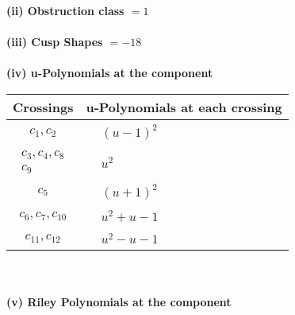 \documentclass[1p]{elsarticle_modified}
\theoremstyle{definition}
\begin{document}
\flushleft \textbf{(ii) Obstruction class $= 1$}\\~\\
\flushleft \textbf{(iii) Cusp Shapes $= -18$}\\~\\
\newpage\renewcommand{\arraystretch}{1}
\flushleft \textbf{(iv) u-Polynomials at the component}\newline \\
\begin{tabular}{m{50pt}|m{274pt}}
Crossings & \hspace{64pt}u-Polynomials at each crossing \\
\hline $$\begin{aligned}c_{1},c_{2}\end{aligned}$$&$\begin{aligned}
&(u-1)^2
\end{aligned}$\\
\hline $$\begin{aligned}c_{3},c_{4},c_{8}\\c_{9}\end{aligned}$$&$\begin{aligned}
&u^2
\end{aligned}$\\
\hline $$\begin{aligned}c_{5}\end{aligned}$$&$\begin{aligned}
&(u+1)^2
\end{aligned}$\\
\hline $$\begin{aligned}c_{6},c_{7},c_{10}\end{aligned}$$&$\begin{aligned}
&u^2+u-1
\end{aligned}$\\
\hline $$\begin{aligned}c_{11},c_{12}\end{aligned}$$&$\begin{aligned}
&u^2- u-1
\end{aligned}$\\
\hline
\end{tabular}\\~\\
\newpage\renewcommand{\arraystretch}{1}
\flushleft \textbf{(v) Riley Polynomials at the component}\newline \\
\end{document}
